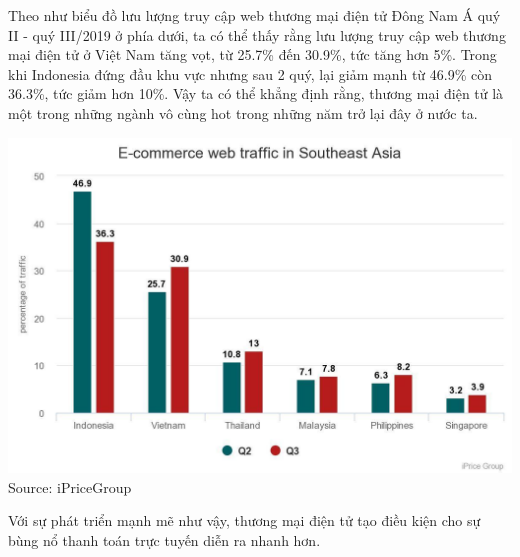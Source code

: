 \documentclass[13pt,a4paper]{article}
\begin{document}
Theo như biểu đồ lưu lượng truy cập web thương mại điện tử Đông Nam Á quý II - quý III/2019 ở phía dưới, ta có thể thấy rằng lưu lượng truy cập web thương mại điện tử ở Việt Nam tăng vọt, từ 25.7\% đến 30.9\%, tức tăng hơn 5\%. Trong khi Indonesia đứng đầu khu vực nhưng sau 2 quý, lại giảm mạnh từ 46.9\% còn 36.3\%, tức giảm hơn 10\%. Vậy ta có thể khẳng định rằng, thương mại điện tử là một trong những ngành vô cùng hot trong những năm trở lại đây ở nước ta.\\
\begin{center}
\includegraphics[scale=0.3]{images/chart.jpg}\\
\fontsize{10pt}{1.2pt}\selectfont
Source: iPriceGroup
\end{center}
Với sự phát triển mạnh mẽ như vậy, thương mại điện tử tạo điều kiện cho sự bùng nổ thanh toán trực tuyến diễn ra nhanh hơn.
\end{document}
